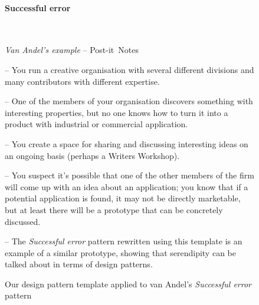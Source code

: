 \begin{figure}[t]
\begin{mdframed}
\paragraph{\textbf{Successful error}}~
\baselineskip
\begin{flushright}\emph{Van Andel's example} -- Post-it\texttrademark\ Notes
\end{flushright}
\vspace{-.15cm}
\begin{description}[itemsep=2pt]
\item[{\tt context}] -- You run a creative organisation with several different divisions and many contributors with different expertise.  
\item[{\tt problem}] -- One of the members of your organisation
  discovers something with interesting properties, but no one
  knows how to turn it into a product with industrial or commercial application.
\item[{\tt solution}] -- You create a space for sharing and discussing
  interesting ideas on an ongoing basis (perhaps a Writers Workshop).
\item[{\tt rationale}] -- You suspect it's possible that one of the
  other members of the firm will come up with an idea about an
  application; you know that if a potential application is found, it
  may not be directly marketable, but at least there will be a
  prototype that can be concretely discussed.
\item[{\tt resolution}] -- The \emph{Successful error} pattern
  rewritten using this template is an example of a similar
  prototype, showing that serendipity can be talked about in
  terms of design patterns.
\end{description}
\end{mdframed}
\caption{Our design pattern template applied to van Andel's \emph{Successful error} pattern\label{fig:va-pattern-figure}}
\end{figure}



